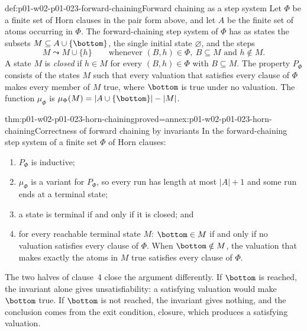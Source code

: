 \begin{hbdefinition}{def:p01-w02-p01-023-forward-chaining}{Forward chaining as a step system}
Let \(\Phi\) be a finite set of Horn clauses in the pair form above, and let
\(A\) be the finite set of atoms occurring in \(\Phi\). The forward-chaining
step system of \(\Phi\) has as states the subsets \(M\subseteq
A\cup\{\bottom\}\), the single initial state \(\varnothing\), and the steps
\[
  M\leadsto M\cup\{h\}
  \qquad\text{whenever }(B,h)\in\Phi,\ B\subseteq M\text{ and }h\notin M.
\]
A state \(M\) is \emph{closed} if \(h\in M\) for every \((B,h)\in\Phi\)
with \(B\subseteq M\). The property \(P_\Phi\) consists of the states
\(M\) such that every valuation that satisfies every clause of \(\Phi\)
makes every member of \(M\) true, where \(\bottom\) is true under no
valuation. The function \(\mu_\Phi\) is
\(\mu_\Phi(M)=\lvert A\cup\{\bottom\}\rvert-\lvert M\rvert\).
\end{hbdefinition}

\begin{hbtheorem}{thm:p01-w02-p01-023-horn-chaining}{proved=annex:p01-w02-p01-023-horn-chaining}{Correctness of forward chaining by invariants}
In the forward-chaining step system of a finite set \(\Phi\) of Horn clauses:
\begin{enumerate}
  \item \(P_\Phi\) is inductive;
  \item \(\mu_\Phi\) is a variant for \(P_\Phi\), so every run has length at
        most \(\lvert A\rvert+1\) and some run ends at a terminal state;
  \item a state is terminal if and only if it is closed; and
  \item for every reachable terminal state \(M\): \(\bottom\in M\) if and
        only if no valuation satisfies every clause of \(\Phi\). When
        \(\bottom\notin M\), the valuation that makes exactly the atoms
        in \(M\) true satisfies every clause of \(\Phi\).
\end{enumerate}
\end{hbtheorem}

The two halves of clause~4 close the argument differently. If \(\bottom\) is
reached, the invariant alone gives unsatisfiability: a satisfying valuation
would make \(\bottom\) true. If \(\bottom\) is not reached, the invariant
gives nothing, and the conclusion comes from the exit condition, closure,
which produces a satisfying valuation.

